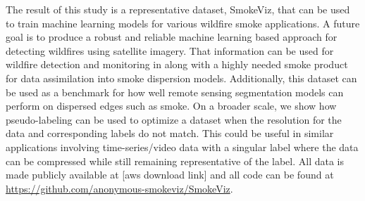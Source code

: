 \documentclass{article}
\begin{document}
The result of this study is a representative dataset, SmokeViz, that can be used to train machine learning models for various wildfire smoke applications. A future goal is to produce a robust and reliable machine learning based approach for detecting wildfires using satellite imagery. That information can be used for wildfire detection and monitoring in along with a highly needed smoke product for data assimilation into smoke dispersion models. Additionally, this dataset can be used as a benchmark for how well remote sensing segmentation models can perform on dispersed edges such as smoke. On a broader scale, we show how pseudo-labeling can be used to optimize a dataset when the resolution for the data and corresponding labels do not match. This could be useful in similar applications involving time-series/video data with a singular label where the data can be compressed while still remaining representative of the label. All data is made publicly available at [aws download link] and all code can be found at \url{https://github.com/anonymous-smokeviz/SmokeViz}.







\end{document}
